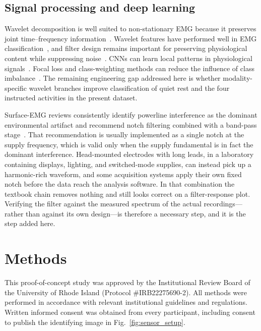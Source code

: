 \documentclass[pdflatex,sn-nature,iicol]{sn-jnl}
\begin{document}
\subsection{Signal processing and deep learning}

Wavelet decomposition is well suited to non-stationary EMG because it preserves joint time--frequency information~\cite{englehart2003robust}. Wavelet features have performed well in EMG classification~\cite{phinyomark2012feature}, and filter design remains important for preserving physiological content while suppressing noise~\cite{chowdhury2013surface}. CNNs can learn local patterns in physiological signals~\cite{faust2018deep,tsinganos2019improved}. Focal loss and class-weighting methods can reduce the influence of class imbalance~\cite{lin2017focal,johnson2019survey}. The remaining engineering gap addressed here is whether modality-specific wavelet branches improve classification of quiet rest and the four instructed activities in the present dataset.

Surface-EMG reviews consistently identify powerline interference as the dominant environmental artifact and recommend notch filtering combined with a band-pass stage~\cite{chowdhury2013surface,raez2006techniques}. That recommendation is usually implemented as a single notch at the supply frequency, which is valid only when the supply fundamental is in fact the dominant interference. Head-mounted electrodes with long leads, in a laboratory containing displays, lighting, and switched-mode supplies, can instead pick up a harmonic-rich waveform, and some acquisition systems apply their own fixed notch before the data reach the analysis software. In that combination the textbook chain removes nothing and still looks correct on a filter-response plot. Verifying the filter against the measured spectrum of the actual recordings---rather than against its own design---is therefore a necessary step, and it is the step added here.

\section{Methods}

This proof-of-concept study was approved by the Institutional Review Board of the University of Rhode Island (Protocol \#IRB22275690-2). All methods were performed in accordance with relevant institutional guidelines and regulations. Written informed consent was obtained from every participant, including consent to publish the identifying image in Fig.~\ref{fig:sensor_setup}.
\end{document}
